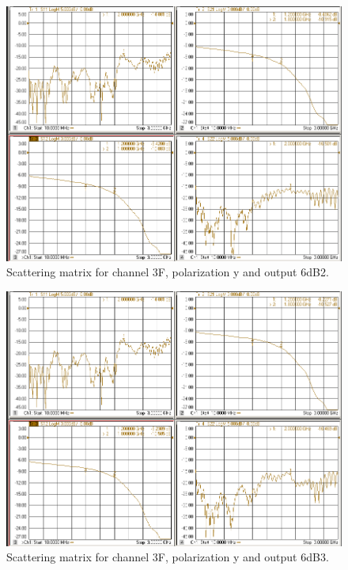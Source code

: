 \documentclass[12pt,a4paper,oneside]{article}
\begin{document}
\begin{figure}[H]
\centering
\includegraphics[width=0.9\linewidth]{VNA_results/3Fy_6dB2.png}
\caption{Scattering matrix for channel 3F, polarization y and output 6dB2.}
\label{fig:3Fy_6dB2}
\end{figure}


\begin{figure}[H]
\centering
\includegraphics[width=0.9\linewidth]{VNA_results/3Fy_6dB3.png}
\caption{Scattering matrix for channel 3F, polarization y and output 6dB3.}
\label{fig:3Fy_6dB3}
\end{figure}
\end{document}
